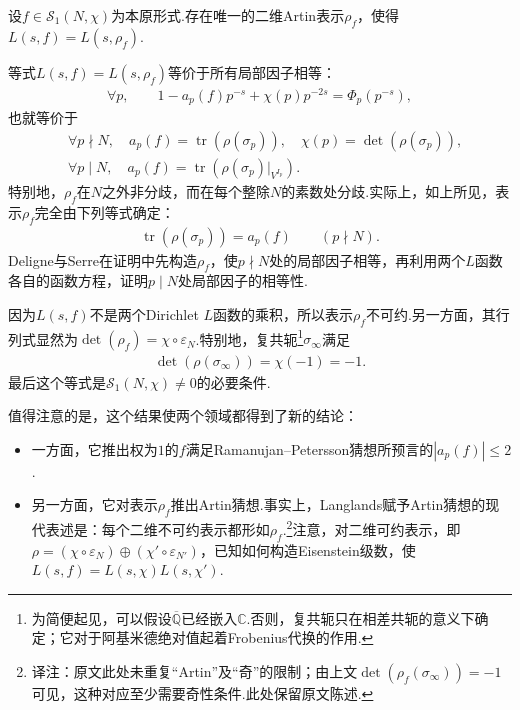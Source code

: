 \begin{theorem*}

设$f\in\mathcal S_1(N,\chi)$为本原形式.存在唯一的二维Artin表示$\rho_f$，使得$L(s,f)=L(s,\rho_f)$.

\end{theorem*}

\begin{remark*}

等式$L(s,f)=L(s,\rho_f)$等价于所有局部因子相等：
\begin{align*}
\forall p,\qquad1-a_p(f)p^{-s}+\chi(p)p^{-2s}=\Phi_p(p^{-s}),
\end{align*}
也就等价于
\begin{align*}
&\forall p\nmid N,\quad a_p(f)=\operatorname{tr}(\rho(\sigma_p)),\quad
\chi(p)=\det(\rho(\sigma_p)),\\
&\forall p\mid N,\quad a_p(f)=\operatorname{tr}\left(\rho(\sigma_p)\big|_{V^{I_p}}\right).
\end{align*}
特别地，$\rho_f$在$N$之外非分歧，而在每个整除$N$的素数处分歧.实际上，如上所见，表示$\rho_f$完全由下列等式确定：
\begin{align*}
\operatorname{tr}(\rho(\sigma_p))=a_p(f)\qquad(p\nmid N).
\end{align*}
Deligne与Serre在证明中先构造$\rho_f$，使$p\nmid N$处的局部因子相等，再利用两个$L$函数各自的函数方程，证明$p\mid N$处局部因子的相等性.

\end{remark*}

\begin{remark*}

因为$L(s,f)$不是两个Dirichlet $L$函数的乘积，所以表示$\rho_f$不可约.另一方面，其行列式显然为$\det(\rho_f)=\chi\circ\varepsilon_N$.特别地，复共轭\footnote{为简便起见，可以假设$\overline{\mathbb Q}$已经嵌入$\mathbb C$.否则，复共轭只在相差共轭的意义下确定；它对于阿基米德绝对值起着Frobenius代换的作用.}$\sigma_\infty$满足
\begin{align*}
\det(\rho(\sigma_\infty))=\chi(-1)=-1.
\end{align*}
最后这个等式是$\mathcal S_1(N,\chi)\ne0$的必要条件.

\end{remark*}

值得注意的是，这个结果使两个领域都得到了新的结论：

\begin{itemize}

\item 一方面，它推出权为$1$的$f$满足Ramanujan--Petersson猜想所预言的$|a_p(f)|\leqslant2$.

\item 另一方面，它对表示$\rho_f$推出Artin猜想.事实上，Langlands赋予Artin猜想的现代表述是：每个二维不可约表示都形如$\rho_f$.\footnote{译注：原文此处未重复``Artin''及``奇''的限制；由上文$\det(\rho_f(\sigma_\infty))=-1$可见，这种对应至少需要奇性条件.此处保留原文陈述.}注意，对二维可约表示，即$\rho=(\chi\circ\varepsilon_N)\oplus(\chi'\circ\varepsilon_{N'})$，已知如何构造Eisenstein级数，使$L(s,f)=L(s,\chi)L(s,\chi')$.

\end{itemize}

